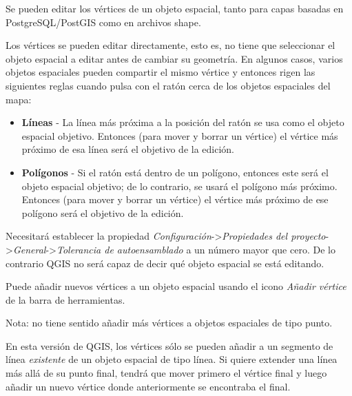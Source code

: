 
Se pueden editar los vértices de un objeto espacial, tanto para capas basadas en PostgreSQL/PostGIS como en archivos shape.

Los vértices se pueden editar directamente, esto es, no tiene que seleccionar el objeto espacial a editar antes de cambiar su geometría. En algunos casos, varios objetos espaciales pueden compartir el mismo vértice y entonces rigen las siguientes reglas cuando pulsa con el ratón cerca de los objetos espaciales del mapa:

\begin{itemize}
\item \textbf{Líneas}   - La línea más próxima a la posición del ratón se usa como el objeto espacial objetivo. Entonces (para mover y borrar un vértice) el vértice más 	                          próximo de esa línea será el objetivo de la edición.

\item \textbf{Polígonos} - Si el ratón está dentro de un polígono, entonces este será el objeto espacial objetivo; de lo contrario, se usará el polígono más próximo. Entonces (para mover y borrar un vértice) el vértice más próximo de ese polígono será el objetivo de la edición.
\end{itemize}

Necesitará establecer la propiedad \textit{Configuración}->\textit{Propiedades del proyecto}->\textit{General}->\textit{Tolerancia de autoensamblado} a un número mayor que cero. De lo contrario QGIS no será capaz de decir qué objeto espacial se está editando.



Puede añadir nuevos vértices a un objeto espacial usando el icono \textit{Añadir vértice} de la barra de herramientas.

Nota: no tiene sentido añadir más vértices a objetos espaciales de tipo punto.

En esta versión de QGIS, los vértices sólo se pueden añadir a un segmento de línea \textit{existente} de un objeto espacial de tipo línea. Si quiere extender una línea más allá de su punto final, tendrá que mover primero el vértice final y luego añadir un nuevo vértice donde anteriormente se encontraba el final.


